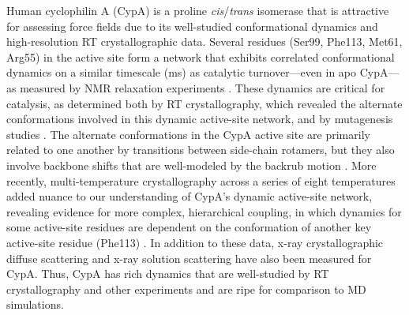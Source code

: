 \documentclass[9pt,review]{livecoms}
\begin{document}
Human cyclophilin A (CypA) is a proline \textit{cis}/\textit{trans} isomerase that is attractive for assessing force fields due to its well-studied conformational dynamics and high-resolution RT crystallographic data.
Several residues (Ser99, Phe113, Met61, Arg55) in the active site form a network that exhibits correlated conformational dynamics on a similar timescale (ms) as catalytic turnover---even in apo CypA---as measured by NMR relaxation experiments \cite{eisenmesser_intrinsic_2005}.
These dynamics are critical for catalysis, as determined both by RT crystallography, which revealed the alternate conformations involved in this dynamic active-site network, and by mutagenesis studies \cite{fraser_hidden_2009}.
The alternate conformations in the CypA active site are primarily related to one another by transitions between side-chain rotamers, but they also involve backbone shifts that are well-modeled by the backrub motion \cite{davis_backrub_2006,friedland_simple_2008}.
More recently, multi-temperature crystallography across a series of eight temperatures added nuance to our understanding of CypA’s dynamic active-site network, revealing evidence for more complex, hierarchical coupling, in which dynamics for some active-site residues are dependent on the conformation of another key active-site residue (Phe113) \cite{keedy_mapping_2015}.
In addition to these data, x-ray crystallographic diffuse scattering \cite{van_benschoten_measuring_2016} and x-ray solution scattering \cite{thompson_temperature-jump_2019} have also been measured for CypA.
Thus, CypA has rich dynamics that are well-studied by RT crystallography and other experiments and are ripe for comparison to MD simulations.
\end{document}
